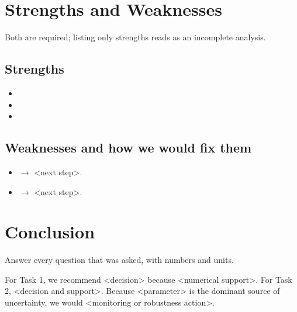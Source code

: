 \documentclass[12pt]{article}
\begin{document}
\section{Strengths and Weaknesses}
Both are required; listing only strengths reads as an incomplete analysis.

\subsection{Strengths}
\begin{itemize}
  \item <strength 1, tied to a verifiable fact>
  \item <strength 2>
  \item <strength 3>
\end{itemize}

\subsection{Weaknesses and how we would fix them}
\begin{itemize}
  \item <limitation 1> $\rightarrow$ <next step>.
  \item <limitation 2> $\rightarrow$ <next step>.
\end{itemize}

\section{Conclusion}
Answer every question that was asked, with numbers and units.

For Task 1, we recommend <decision> because <numerical support>. For Task 2,
<decision and support>. Because <parameter> is the dominant source of
uncertainty, we would <monitoring or robustness action>.




\newpage
\end{document}
